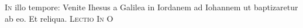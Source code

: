 \begin{multicols*}{2}
\lettrine[lines=2]{\zallmancaps \color{Blue} I}{n} illo tempore: Venite Ihesus a Galilea in Iordanem ad Iohannem ut baptizaretur ab eo. Et reliqua.
 
\lettrine[lines=2]{\zallmancaps \color{Red} L}{ectio}
\lettrine[lines=2]{\zallmancaps \color{Blue} I}{n}
\lettrine[lines=2]{\zallmancaps \color{Red} O}{}






\end{multicols*}
